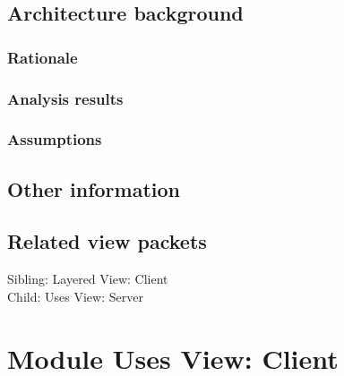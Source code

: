 \documentclass[a4paper,10pt]{article}
\begin{document}
\subsection{Architecture background}

\subsubsection{Rationale}

\subsubsection{Analysis results}

\subsubsection{Assumptions}

\subsection{Other information}

\subsection{Related view packets}

Sibling: Layered View: Client\\
Child: Uses View: Server\\

\section{Module Uses View: Client}
\end{document}
